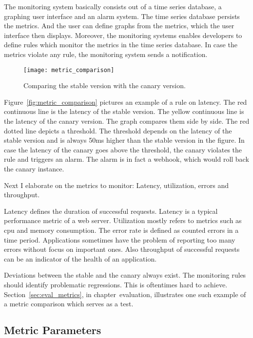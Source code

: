 The monitoring system basically consists out of a time series database, a graphing user
interface and an alarm system. The time series database persists the metrics. And the user
can define graphs from the metrics, which the user interface then displays. Moreover, the
monitoring systems enables developers to define rules which monitor the metrics in the
time series database. In case the metrics violate any rule, the monitoring system sends a
notification.

\begin{figure}[htbp]
  \centering
  \texttt{[image: metric\_comparison]}
  \caption[metric_comparison]{Comparing the stable version with the canary version.}
  \label{fig:metrics_comparison}
\end{figure}

Figure~\ref{fig:metric_comparison} pictures an example of a rule on latency. The red
continuous line is the latency of the stable version. The yellow continuous line is the
latency of the canary version. The graph compares them side by side. The red dotted line
depicts a threshold. The threshold depends on the latency of the stable version and is
always 50ms higher than the stable version in the figure. In case the latency of the
canary goes above the threshold, the canary violates the rule and triggers an alarm. The
alarm is in fact a webhook, which would roll back the canary instance.

Next I elaborate on the metrics to monitor: Latency, utilization, errors and throughput.

Latency defines the duration of successful requests. Latency is a typical performance
metric of a web server. Utilization mostly refers to metrics such as cpu and memory
consumption. The error rate is defined as counted errors in a time period. Applications
sometimes have the problem of reporting too many errors without focus on important
ones. Also throughput of successful requests can be an indicator of the health of an
application.

Deviations between the stable and the canary always exist. The monitoring rules should
identify problematic regressions. This is oftentimes hard to
achieve. Section~\ref{sec:eval_metrics}, in chapter~evaluation, illustrates one such
example of a metric comparison which serves as a test.

\subsection{Metric Parameters}

